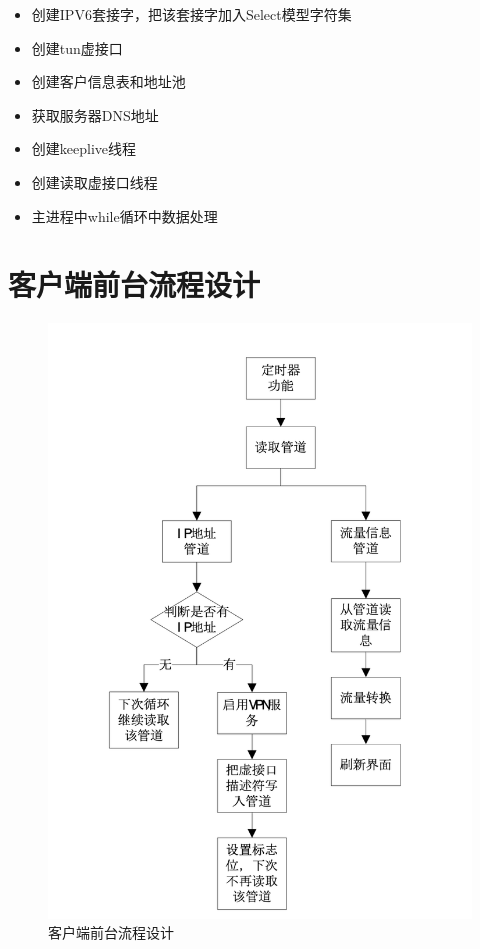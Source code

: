 \begin{itemize}
  \item 创建IPV6套接字，把该套接字加入Select模型字符集
  \item 创建tun虚接口
  \item 创建客户信息表和地址池
  \item 获取服务器DNS地址
  \item 创建keeplive线程
  \item 创建读取虚接口线程
  \item 主进程中while循环中数据处理
\end{itemize}

\section{客户端前台流程设计}
\begin{figure}[!ht]
	\begin{center}
	\includegraphics[scale=.58]{front.png}
	\end{center}
	\caption{客户端前台流程设计}
	\label{figure:客户端前台流程设计}
\end{figure}
